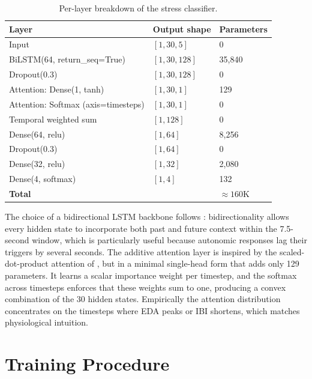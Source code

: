 \begin{table}[H]
\centering
\caption{Per-layer breakdown of the stress classifier.}
\label{tab:layers}
\small
\begin{tabular}{lll}
\toprule
\textbf{Layer} & \textbf{Output shape} & \textbf{Parameters} \\
\midrule
Input                     & $[1, 30, 5]$   & 0      \\
BiLSTM(64, return\_seq=True) & $[1, 30, 128]$ & 35{,}840 \\
Dropout(0.3)              & $[1, 30, 128]$ & 0      \\
Attention: Dense(1, tanh) & $[1, 30, 1]$   & 129    \\
Attention: Softmax (axis=timesteps) & $[1, 30, 1]$ & 0 \\
Temporal weighted sum     & $[1, 128]$     & 0      \\
Dense(64, relu)           & $[1, 64]$      & 8{,}256 \\
Dropout(0.3)              & $[1, 64]$      & 0      \\
Dense(32, relu)           & $[1, 32]$      & 2{,}080 \\
Dense(4, softmax)         & $[1, 4]$       & 132    \\
\midrule
\textbf{Total}            &                & $\approx 160$K \\
\bottomrule
\end{tabular}
\end{table}

The choice of a bidirectional LSTM backbone follows
\citet{graves2005bilstm}: bidirectionality allows every hidden state
to incorporate both past and future context within the 7.5-second
window, which is particularly useful because autonomic responses
lag their triggers by several seconds. The additive attention layer
is inspired by the scaled-dot-product attention of
\citet{vaswani2017attention}, but in a minimal single-head form
that adds only 129 parameters. It learns a scalar importance weight
per timestep, and the softmax across timesteps enforces that these
weights sum to one, producing a convex combination of the 30 hidden
states. Empirically the attention distribution concentrates on the
timesteps where EDA peaks or IBI shortens, which matches physiological
intuition.

\section{Training Procedure}
\label{sec:m-train}

